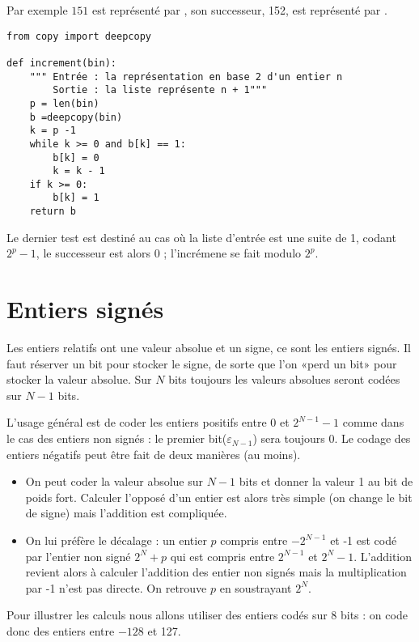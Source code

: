 Par exemple $151$ est représenté par \type{[1, 0, 0, 1, 0, 1, 1, 1]},  son successeur, 152, est représenté par  \type{[1, 0, 0, 1, 1, 0, 0, 0]}.
\begin{lstlisting}
from copy import deepcopy

def increment(bin):
    """ Entrée : la représentation en base 2 d'un entier n
        Sortie : la liste représente n + 1"""
    p = len(bin)
    b =deepcopy(bin)
    k = p -1
    while k >= 0 and b[k] == 1:
        b[k] = 0
        k = k - 1
    if k >= 0:
        b[k] = 1
    return b
\end{lstlisting}
Le dernier test est destiné au cas où la liste d'entrée est une suite de 1, codant $2^p-1$, le successeur est alors 0 ; l'incrémene se fait modulo $2^p$.
\newpage
\section{Entiers signés}
Les entiers relatifs ont une valeur absolue et un signe, ce sont les entiers signés. Il faut réserver un bit pour stocker le signe, de sorte que l'on «perd un bit» pour stocker la valeur absolue. Sur $N$  bits toujours les valeurs absolues seront codées sur $N-1$ bits.

L'usage général est de coder les entiers positifs entre 0 et $2^{N-1}-1$ comme dans le cas des entiers non signés : le premier bit($\varepsilon_{N-1}$) sera toujours 0. Le codage des entiers négatifs peut être fait de deux manières (au moins).
\begin{itemize}
\item On peut coder la valeur absolue sur $N-1$ bits et donner la valeur 1 au bit de poids fort. Calculer l'opposé d'un entier est alors très simple (on change le bit de signe) mais l'addition est compliquée.
\item On lui préfère le décalage : un entier $p$ compris entre $-2^{N-1}$ et -1 est codé par l'entier non signé $2^{N} + p$ qui est compris entre $2^{N-1}$ et  $2^{N}-1$. L'addition revient alors à calculer l'addition des entier non signés mais la multiplication par -1 n'est pas directe. On retrouve $p$ en soustrayant $2^N$.
\end{itemize}
Pour illustrer les calculs nous allons utiliser des entiers codés sur 8 bits : on code donc des entiers entre $-128$ et 127. 

